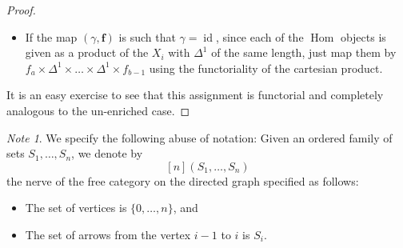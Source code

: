 \documentclass[leqno]{article}
\numberwithin{equation}{subsection}
\theoremstyle{plain}   %
\theoremstyle{remark}
\newtheorem{note}[equation]{Note}
\newtheorem{defn}[equation]{Definition}
\theoremstyle{plain}
\DeclareMathOperator{\id}{id}
\newcommand{\Cat}{\ensuremath{\mathbf{Cat}}}
\DeclareMathOperator{\Hom}{Hom}
\newcommand{\psh}[1]{\ensuremath{\widehat{#1}}}
\renewcommand{\C}{\ensuremath{\mathcal{C}}}
\newcommand{\cellset}{\ensuremath{\widehat{\Theta[\mathcal{C}]}}}
\newcommand{\spsh}{\ensuremath{\operatorname{Psh}_\Delta(\mathcal{C})}}
\begin{document}
\begin{proof}
\begin{itemize}
		\item If the map \((\gamma,\mathbf{f})\) is such that \(\gamma=\id\), since each of the \(\Hom\) objects is given as 	a product of the \(X_i\) with \(\Delta^1\) of the same length, just map them by \(f_a\times\Delta^1\times \dots 	\times\Delta^1 \times f_{b-1}\) using the functoriality of the cartesian product.
	\end{itemize}
	It is an easy exercise to see that this assignment is functorial and completely analogous to the un-enriched case.
\end{proof}
\begin{comment}
	\begin{defn} Let \(\mathfrak{C}\) be the composite \[\Theta[\C]\hookrightarrow\Delta\int \psh{\C} \xrightarrow{Q} \Cat_{\spsh}.\] Since \(\Cat_{\spsh}\) is cocomplete, there exists a colimit-preserving extension to \(\cellset\), the \emph{homotopy-coherent realization}, which by abuse of notation, we also call \(\mathfrak{C}\).  It is the left adjoint in an adjunction \[\mathfrak{C}:\cellset\rightleftarrows \Cat_{\spsh}:\mathfrak{N},\]  wherein the right adjoint is called the \emph{homotopy-coherent nerve}.
	\end{defn}
\end{comment}

\begin{note}
	We specify the following abuse of notation: Given an ordered family of sets \(S_1,\dots, S_n\), we denote by
	\[
		[n](S_1,\dots,S_n)
	\]
	the nerve of the free category on the directed graph specified as follows:
	\begin{itemize}
		\item The set of vertices is \(\{0,\dots,n\}\), and
		\item The set of arrows from the vertex \(i-1\) to \(i\) is \(S_i\).
	\end{itemize}
\end{note}
\end{document}
